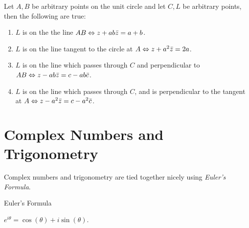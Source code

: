 \documentclass[10pt]{article}
\begin{document}
\bigskip

\begin{cor}
Let $A, B$ be arbitrary points on the unit circle and let $C, L$ be arbitrary points, then the following are true:
\end{cor}

\begin{enumerate}
    \item $L$ is on the the line $AB \Leftrightarrow z + ab\bar{z} = a+b$.
    \item $L$ is on the line tangent to the circle at $A \Leftrightarrow z + a^{2}\bar{z} = 2a$.
    \item $L$ is on the line which passes through $C$ and perpendicular to $AB \Leftrightarrow z - ab\bar{z} = c - ab\bar{c}$.
    \item $L$ is on the line which passes through $C$, and is perpendicular to the tangent at $A \Leftrightarrow z - a^{2}\bar{z} = c - a^{2}\bar{c}$. 
\end{enumerate}

\section*{Complex Numbers and Trigonometry}

Complex numbers and trigonometry are tied together nicely using \emph{Euler's Formula}. 

\medskip

\begin{defn}{Euler's Formula}

$e^{i\theta} = \cos{(\theta)} + i\sin{(\theta)}$.
\end{defn}

\bigskip
\end{document}
